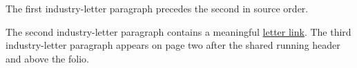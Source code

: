 \documentclass[medium=print]{careerdossier-letter}
\begin{document}
\MakeCDossierLetterhead
The first industry-letter paragraph precedes the second in source order.

The second industry-letter paragraph contains a meaningful
\href{https://example.test/letter}{letter link}.
\newpage
The third industry-letter paragraph appears on page two after the shared
running header and above the folio.
\MakeCDossierClosing
\end{document}
